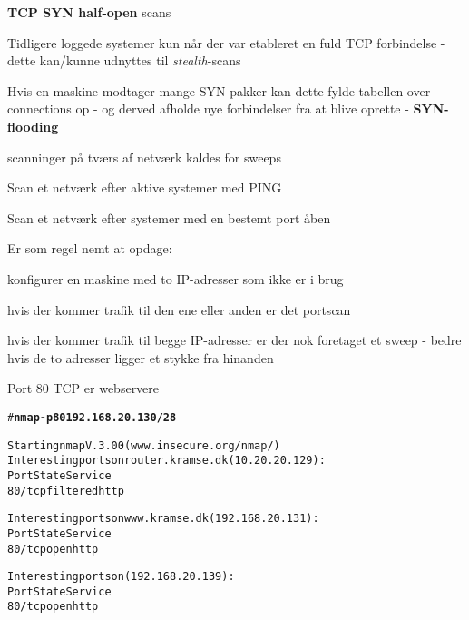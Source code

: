 \documentclass[20pt,landscape,a4paper,footrule]{foils}
\begin{document}


\begin{list2}
\item {\bfseries TCP SYN half-open} scans
\item Tidligere loggede systemer kun når der var etableret en fuld TCP
  forbindelse - dette kan/kunne udnyttes til \emph{stealth}-scans
\item Hvis en maskine modtager mange SYN pakker kan dette fylde
  tabellen over connections op - og derved afholde nye forbindelser
  fra at blive oprette - {\bfseries SYN-flooding}
\end{list2}



\begin{list1}
\item scanninger på tværs af netværk kaldes for sweeps 
\item Scan et netværk efter aktive systemer med PING
\item Scan et netværk efter systemer med en bestemt port åben
\item Er som regel nemt at opdage:
  \begin{list2}
    \item konfigurer en maskine med to IP-adresser som ikke er i brug
\item hvis der kommer trafik til den ene eller anden er det portscan
\item hvis der kommer trafik til begge IP-adresser er der nok
  foretaget et sweep - bedre hvis de to adresser ligger et stykke fra hinanden
  \end{list2}

\end{list1}


\begin{list1}
  \item Port 80 TCP er webservere
\end{list1}

\begin{alltt}
\small # {\bfseries nmap  -p 80 192.168.20.130/28}

Starting nmap V. 3.00 ( www.insecure.org/nmap/ )
Interesting ports on router.kramse.dk (10.20.20.129):
Port       State       Service
80/tcp     filtered    http                    

Interesting ports on www.kramse.dk (192.168.20.131):
Port       State       Service
80/tcp     open        http                    

Interesting ports on  (192.168.20.139):
Port       State       Service
80/tcp     open        http                    

\end{alltt}
\end{document}
